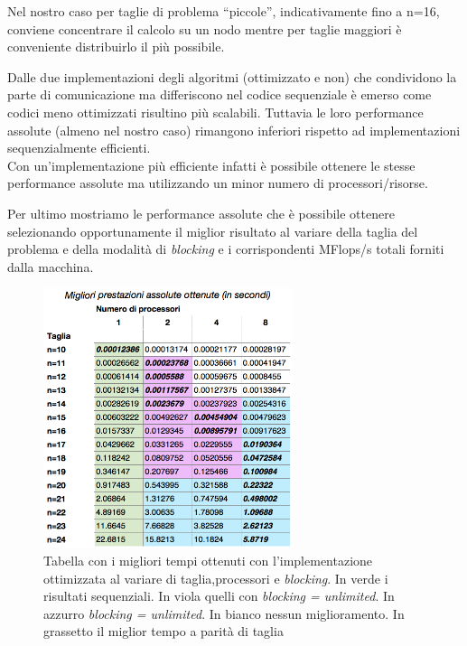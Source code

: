 \documentclass[12pt,a4paper,oneside,openright]{article}
\begin{document}
Nel nostro caso per taglie di problema ``piccole'', indicativamente fino a n=16, conviene concentrare il calcolo su un nodo mentre per taglie maggiori è conveniente distribuirlo il più possibile.

Dalle  due implementazioni degli algoritmi (ottimizzato e non) che condividono la parte di comunicazione ma differiscono nel codice sequenziale è emerso come codici meno ottimizzati risultino più scalabili. Tuttavia le loro performance assolute (almeno nel nostro caso) rimangono inferiori rispetto ad implementazioni sequenzialmente efficienti.\\ Con un'implementazione più efficiente infatti è possibile ottenere le stesse performance assolute ma utilizzando un minor numero di processori/risorse.

Per ultimo mostriamo le performance assolute che è possibile ottenere selezionando opportunamente il miglior risultato al variare della taglia del problema e della modalità di \emph{blocking} e i corrispondenti MFlops/s totali forniti dalla macchina.
\begin{figure}[htp] 
  \centering
  \linespread{1}
      \includegraphics[width=0.65\textwidth]{immagini/best_performance}
  \caption{\small Tabella con i migliori tempi ottenuti con l'implementazione ottimizzata al variare di taglia,processori e \emph{blocking}. In verde i risultati sequenziali. In viola quelli con \emph{blocking = unlimited}. In azzurro \emph{blocking = unlimited}. In bianco nessun miglioramento. In grassetto il miglior tempo a parità di taglia}
\end{figure}
\end{document}
